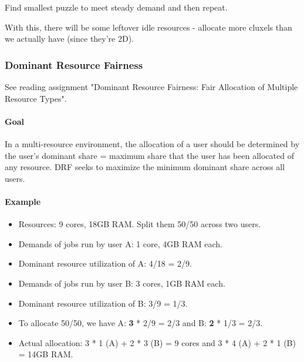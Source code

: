 Find smallest puzzle to meet steady demand and then repeat.

With this, there will be some leftover idle resources - allocate more cluxels than we actually have (since they're 2D).



\subsubsection{Dominant Resource Fairness}

See reading assignment "Dominant Resource Fairness: Fair Allocation of Multiple Resource Types".

\paragraph{Goal}
In a multi-resource environment, the allocation of a user should be determined by the user's dominant share = maximum share that the user has been allocated of any resource. DRF seeks to maximize the minimum dominant share across all users.

\paragraph{Example}
\begin{itemize}
    \item Resources: 9 cores, 18GB RAM. Split them 50/50 across two users.
    \item Demands of jobs run by user A: 1 core, 4GB RAM each.
    \item Dominant resource utilization of A: 4/18 = 2/9.
    \item Demands of jobs run by user B: 3 cores, 1GB RAM each.
    \item Dominant resource utilization of B: 3/9 = 1/3.
    \item To allocate 50/50, we have A: \textbf{3} * 2/9 = 2/3 and B: \textbf{2} * 1/3 = 2/3. %
    \item Actual allocation: 3 * 1 (A) + 2 * 3 (B) = 9 cores and 3 * 4 (A) + 2 * 1 (B) = 14GB RAM.
\end{itemize}


